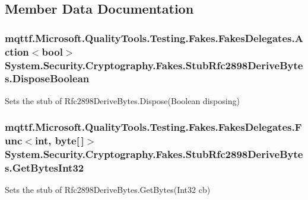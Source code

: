 \subsection{Member Data Documentation}
\hypertarget{class_system_1_1_security_1_1_cryptography_1_1_fakes_1_1_stub_rfc2898_derive_bytes_ade568c36f867aa9b5ed80ebc56e74f66}{
\subsubsection[{Dispose\-Boolean}]{\setlength{\rightskip}{0pt plus 5cm}mqttf.\-Microsoft.\-Quality\-Tools.\-Testing.\-Fakes.\-Fakes\-Delegates.\-Action$<$bool$>$ System.\-Security.\-Cryptography.\-Fakes.\-Stub\-Rfc2898\-Derive\-Bytes.\-Dispose\-Boolean}}\label{class_system_1_1_security_1_1_cryptography_1_1_fakes_1_1_stub_rfc2898_derive_bytes_ade568c36f867aa9b5ed80ebc56e74f66}


Sets the stub of Rfc2898\-Derive\-Bytes.\-Dispose(\-Boolean disposing)

\hypertarget{class_system_1_1_security_1_1_cryptography_1_1_fakes_1_1_stub_rfc2898_derive_bytes_a3447bdc6dec428b41259af1260268770}{
\subsubsection[{Get\-Bytes\-Int32}]{\setlength{\rightskip}{0pt plus 5cm}mqttf.\-Microsoft.\-Quality\-Tools.\-Testing.\-Fakes.\-Fakes\-Delegates.\-Func$<$int, byte\mbox{[}$\,$\mbox{]}$>$ System.\-Security.\-Cryptography.\-Fakes.\-Stub\-Rfc2898\-Derive\-Bytes.\-Get\-Bytes\-Int32}}\label{class_system_1_1_security_1_1_cryptography_1_1_fakes_1_1_stub_rfc2898_derive_bytes_a3447bdc6dec428b41259af1260268770}


Sets the stub of Rfc2898\-Derive\-Bytes.\-Get\-Bytes(\-Int32 cb)

